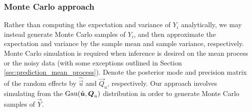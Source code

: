 \documentclass[12pt,a4paper]{article}
\begin{document}
\begin{appendices}
\subsubsection{Monte Carlo approach}

Rather than computing the expectation and variance of $Y_i$ analytically, we may instead generate Monte Carlo samples of $Y_i$, and then approximate the expectation and variance by the sample mean and sample variance, respectively. 
Monte Carlo simulation is required when inference is desired on the mean process or the noisy data (with some exceptions outlined in Section \ref{sec:prediction_mean_process}). 
Denote the posterior mode and precision matrix of the random effects by $\hat{\vec{u}}$ and $\vec{Q}_{u}$, respectively. 
Our approach involves simulating from the $\Gau(\hat{\vec{u}}, \vec{Q}_{u})$ distribution in order to generate Monte Carlo samples of $\vec{Y}$.
%

\end{appendices}
\end{document}
